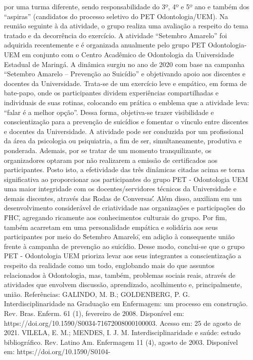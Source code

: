 por uma turma diferente, sendo responsabilidade do 3º, 4º e 5º ano e também dos “aspiras” (candidatos 
do processo seletivo do PET Odontologia/UEM). Na reunião seguinte à da atividade, o grupo realiza 
uma avaliação a respeito do tema tratado e da decorrência do exercício.
A atividade “Setembro Amarelo” foi adquirida recentemente e é organizada anualmente pelo grupo 
PET Odontologia-UEM em conjunto com o Centro Acadêmico de Odontologia da Universidade 
Estadual de Maringá. A dinâmica surgiu no ano de 2020 com base na campanha “Setembro Amarelo 
– Prevenção ao Suicídio” e objetivando apoio aos discentes e docentes da Universidade. Trata-se de 
um exercício leve e empático, em forma de bate-papo, onde os participantes dividem experiências 
compartilhadas e individuais de suas rotinas, colocando em prática o emblema que a atividade leva: 
“falar é a melhor opção”. Dessa forma, objetiva-se trazer visibilidade e conscientização para a 
prevenção de suicídios e fomentar o vínculo entre discentes e docentes da Universidade. A atividade 
pode ser conduzida por um profissional da área da psicologia ou psiquiatria, a fim de ser, 
simultaneamente, produtiva e ponderada. Ademais, por se tratar de um momento tranquilizante, os 
organizadores optaram por não realizarem a emissão de certificados aos participantes.
Posto isto, a efetividade das três dinâmicas citadas acima se torna significativa ao proporcionar aos 
participantes do grupo PET - Odontologia UEM uma maior integridade com os docentes/servidores 
técnicos da Universidade e demais discentes, através das \"Rodas de Conversas\'\'. Além disso, auxiliam 
em um desenvolvimento considerável de criatividade nas organizações e participações do \"FHC\", 
agregando ricamente aos conhecimentos culturais do grupo. Por fim, também acarretam em uma 
personalidade empática e solidária aos seus participantes por meio do \"Setembro Amarelo\", em adição 
à consequente união frente à campanha de prevenção ao suicídio.
Desse modo, conclui-se que o grupo PET - Odontologia UEM prioriza levar aos seus integrantes a 
conscientização a respeito da realidade como um todo, englobando mais do que assuntos relacionados 
à Odontologia, mas, também, problemas sociais reais, através de atividades que envolvem discussão, 
aprendizado, acolhimento e, principalmente, união.
Referências:
GALINDO, M. B.; GOLDENBERG, P. G. Interdisciplinaridade na Graduação em Enfermagem: um 
processo em construção. Rev. Bras. Enferm. 61 (1), fevereiro de 2008. Disponível em: 
https://doi.org/10.1590/S0034-71672008000100003. Acesso em: 25 de agosto de 2021.
VILELA, E. M.; MENDES, I. J. M. Interdisciplinaridade e saúde: estudo bibliográfico. Rev. LatinoAm. Enfermagem 11 (4), agosto de 2003. Disponível em: https://doi.org/10.1590/S0104-
